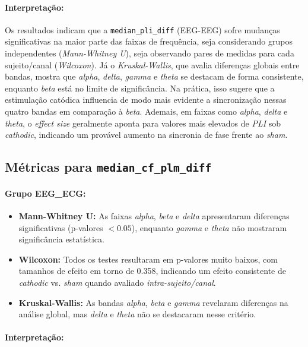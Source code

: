 \paragraph{Interpretação:}
Os resultados indicam que a \texttt{median\_pli\_diff} (EEG-EEG) sofre mudanças significativas na maior parte das faixas de frequência, seja considerando grupos independentes (\emph{Mann-Whitney U}), seja observando pares de medidas para cada sujeito/canal (\emph{Wilcoxon}). Já o \emph{Kruskal-Wallis}, que avalia diferenças globais entre bandas, mostra que \emph{alpha}, \emph{delta}, \emph{gamma} e \emph{theta} se destacam de forma consistente, enquanto \emph{beta} está no limite de significância. 
Na prática, isso sugere que a estimulação catódica influencia de modo mais evidente a sincronização nessas quatro bandas em comparação à \emph{beta}. Ademais, em faixas como \emph{alpha}, \emph{delta} e \emph{theta}, o \emph{effect size} geralmente aponta para valores mais elevados de \emph{PLI} sob \textit{cathodic}, indicando um provável aumento na sincronia de fase frente ao \textit{sham}.

\subsection{Métricas para \texttt{median\_cf\_plm\_diff}}
\paragraph{Grupo EEG\_ECG:}
\begin{itemize}
    \item \textbf{Mann-Whitney U:} As faixas \emph{alpha}, \emph{beta} e \emph{delta} apresentaram diferenças significativas (p-valores $< 0.05$), enquanto \emph{gamma} e \emph{theta} não mostraram significância estatística.
    \item \textbf{Wilcoxon:} Todos os testes resultaram em p-valores muito baixos, com tamanhos de efeito em torno de 0.358, indicando um efeito consistente de \textit{cathodic} vs. \textit{sham} quando avaliado \emph{intra-sujeito/canal}.
    \item \textbf{Kruskal-Wallis:} As bandas \emph{alpha}, \emph{beta} e \emph{gamma} revelaram diferenças na análise global, mas \emph{delta} e \emph{theta} não se destacaram nesse critério.
\end{itemize}

\paragraph{Interpretação:}

